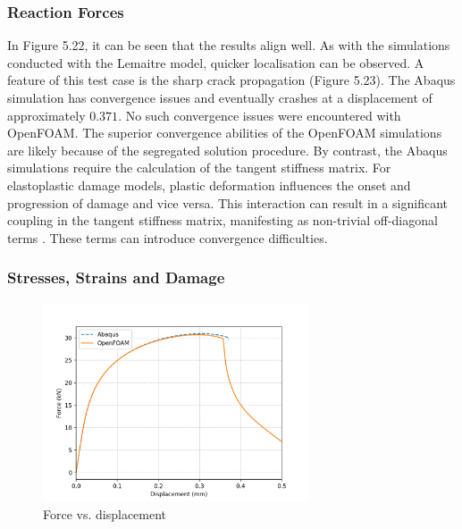 \documentclass[sn-mathphys,Numbered,draft]{sn-jnl}%
\begin{document}

\subsubsection{Reaction Forces}

In Figure 5.22, it can be seen that the results align well.
As with the simulations conducted with the Lemaitre model, quicker localisation can be observed.
A feature of this test case is the sharp crack propagation (Figure 5.23).
The Abaqus simulation has convergence issues and eventually crashes at a displacement of approximately $0.371$.
No such convergence issues were encountered with OpenFOAM.
The superior convergence abilities of the OpenFOAM simulations are likely because of the segregated solution procedure.
By contrast, the Abaqus simulations require the calculation of the tangent stiffness matrix.
For elastoplastic damage models, plastic deformation influences the onset and progression of damage and vice versa.
This interaction can result in a significant coupling in the tangent stiffness matrix, manifesting as non-trivial off-diagonal terms \cite{bathe_finite_1996}.
These terms can introduce convergence difficulties.

\subsubsection{Stresses, Strains and Damage}

\begin{figure}[htb]
\begin{center}
	\includegraphics[width=0.7\textwidth]{./Figures/GTNCompare/forceDispGTN.jpg}
\caption{Force vs. displacement}
\label{fig:notchedRoundBAr}
\end{center}
\end{figure}
\end{document}
